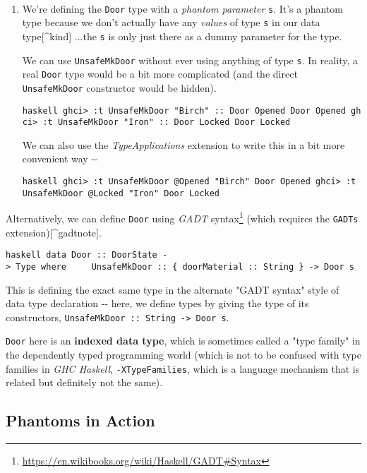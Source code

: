 \documentclass[]{article}
\renewcommand{\href}[2]{#2\footnote{\url{#1}}}
\begin{document}
~

\begin{enumerate}
\item
  We're defining the \texttt{Door} type with a \emph{phantom parameter}
  \texttt{s}. It's a phantom type because we don't actually have any
  \emph{values} of type \texttt{s} in our data type{[}\^{}kind{]} ...the
  \texttt{s} is only just there as a dummy parameter for the type.

  We can use \texttt{UnsafeMkDoor} without ever using anything of type
  \texttt{s}. In reality, a real \texttt{Door} type would be a bit more
  complicated (and the direct \texttt{UnsafeMkDoor} constructor would be
  hidden).

  \texttt{haskell\ ghci\textgreater{}\ :t\ UnsafeMkDoor\ "Birch"\ ::\ Door\ \textquotesingle{}Opened\ Door\ \textquotesingle{}Opened\ ghci\textgreater{}\ :t\ UnsafeMkDoor\ "Iron"\ ::\ Door\ \textquotesingle{}Locked\ Door\ \textquotesingle{}Locked}

  We can also use the \emph{TypeApplications} extension to write this in a bit
  more convenient way -\/-

  \texttt{haskell\ ghci\textgreater{}\ :t\ UnsafeMkDoor\ @\textquotesingle{}Opened\ "Birch"\ Door\ \textquotesingle{}Opened\ ghci\textgreater{}\ :t\ UnsafeMkDoor\ @\textquotesingle{}Locked\ "Iron"\ Door\ \textquotesingle{}Locked}
\end{enumerate}

Alternatively, we can define \texttt{Door} using
\href{https://en.wikibooks.org/wiki/Haskell/GADT\#Syntax}{\emph{GADT} syntax}
(which requires the \texttt{GADTs} extension){[}\^{}gadtnote{]}.

\texttt{haskell\ data\ Door\ ::\ DoorState\ -\textgreater{}\ Type\ where\ \ \ \ \ UnsafeMkDoor\ ::\ \{\ doorMaterial\ ::\ String\ \}\ -\textgreater{}\ Door\ s}

This is defining the exact same type in the alternate "GADT syntax" style of
data type declaration -\/- here, we define types by giving the type of its
constructors, \texttt{UnsafeMkDoor\ ::\ String\ -\textgreater{}\ Door\ s}.

\texttt{Door} here is an \textbf{indexed data type}, which is sometimes called a
"type family" in the dependently typed programming world (which is not to be
confused with type families in \emph{GHC Haskell}, \texttt{-XTypeFamilies},
which is a language mechanism that is related but definitely not the same).

\subsection{Phantoms in Action}
\end{document}
